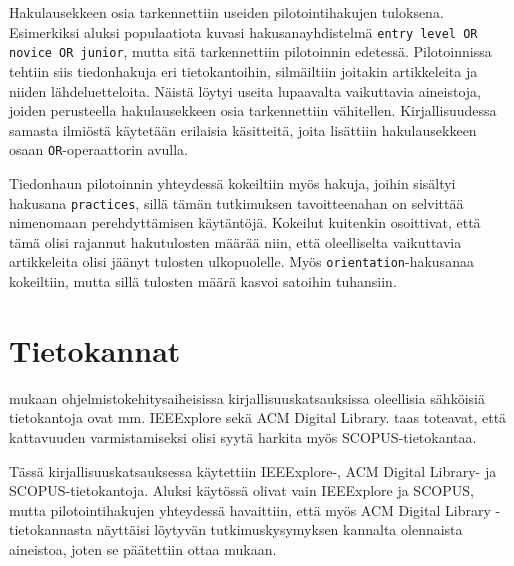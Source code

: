 \documentclass[utf8]{gradu3}
\begin{document}
Hakulausekkeen osia tarkennettiin useiden pilotointihakujen tuloksena. Esimerkiksi aluksi populaatiota kuvasi hakusanayhdistelmä {\tt entry level OR novice OR junior}, mutta sitä tarkennettiin pilotoinnin edetessä. Pilotoinnissa tehtiin siis tiedonhakuja eri tietokantoihin, silmäiltiin joitakin artikkeleita ja niiden lähdeluetteloita. Näistä löytyi useita lupaavalta vaikuttavia aineistoja, joiden perusteella hakulausekkeen osia tarkennettiin vähitellen. Kirjallisuudessa samasta ilmiöstä käytetään erilaisia käsitteitä, joita lisättiin hakulausekkeen osaan {\tt OR}-operaattorin avulla.

Tiedonhaun pilotoinnin yhteydessä kokeiltiin myös hakuja, joihin sisältyi hakusana {\tt practices}, sillä tämän tutkimuksen tavoitteenahan on selvittää nimenomaan perehdyttämisen käytäntöjä. Kokeilut kuitenkin osoittivat, että tämä olisi rajannut hakutulosten määrää niin, että oleelliselta vaikuttavia artikkeleita olisi jäänyt tulosten ulkopuolelle. Myös {\tt orientation}-hakusanaa kokeiltiin, mutta sillä tulosten määrä kasvoi satoihin tuhansiin.  

\section{Tietokannat}

\textcite{brereton-ym-2007} mukaan ohjelmistokehitysaiheisissa kirjallisuuskatsauksissa oleellisia sähköisiä tietokantoja ovat mm. IEEExplore sekä ACM Digital Library. \textcite{kitchenham-charters-2007} taas toteavat, että kattavuuden varmistamiseksi olisi syytä harkita myös SCOPUS-tietokantaa.

Tässä kirjallisuuskatsauksessa käytettiin IEEExplore-, ACM Digital Library- ja SCOPUS-tietokantoja. Aluksi käytössä olivat vain IEEExplore ja SCOPUS, mutta pilotointihakujen yhteydessä havaittiin, että myös ACM Digital Library -tietokannasta näyttäisi löytyvän tutkimuskysymyksen kannalta olennaista aineistoa, joten se päätettiin ottaa mukaan.
\end{document}
